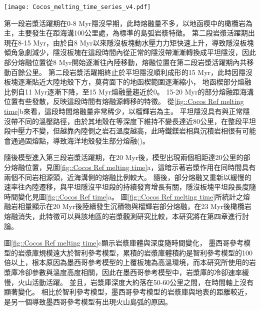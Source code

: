 \begin{figure*}[ht!]
    \centering
    \texttt{[image: Cocos\_melting\_time\_series\_v4.pdf]}
    \caption[墨西哥參考模型岩漿作用隨時間變化]{墨西哥參考模型岩漿作用隨時間變化，灰色底標出平坦隱沒發育後時間段。(a)部分熔融與海溝之距離隨時間變化圖，縱軸中每個點代表每次部分熔融發生位置，顏色為指數上的部分熔融比例。(b)岩石熔融量隨時間變化圖，熔融量單位為每單位海溝產生之立方公里量中每20萬年瞬時量。顏色代表不同岩相。(c)岩漿庫體積與深度隨時間變化圖，岩漿庫單位為每單位海溝之立方公里量。顏色代表該時間中岩漿庫的平均所在深度。}
    \label{fig::Cocos Ref melting time}
\end{figure*}

第一段岩漿活躍期在0-8 Myr隱沒早期，此時熔融量不多，以地函楔中的橄欖岩為主，主要發生在距海溝100公里處，為標準的島弧岩漿特徵。
第二段岩漿活躍期出現在8-15 Myr，由於自8 Myr以來隱沒板塊動水壓力力矩快速上升，導致隱沒板塊傾角急劇減少，隱沒板塊在這段時間內從正常的隱沒帶漸漸轉換成平坦隱沒，因此部分熔融位置從8 Myr開始逐漸往內陸移動，熔融位置在第二段岩漿活躍期內共移動百餘公里。
第二段岩漿活躍期終止於平坦隱沒順利成形的15 Myr，此時因隱沒板塊逐漸貼近大陸地殼下方，莫荷面下的地函楔範圍逐漸縮小，
地函楔部分熔融比例自11 Myr逐漸下降，至15 Myr熔融量趨近於0。
15-20 Myr的部分熔融距海溝位置有些發散，反映這段時間有熔融源轉移的特徵。
從\ref{fig::Cocos Ref melting time}b來看，這段時間熔融量非常稀少，以榴輝岩為主。
平坦隱沒具有與正常隱沒帶不同的溫壓路徑，由於其地殼在等深度下維持不變長達近80公里，在整段平坦段中壓力不變，但越靠內陸側之岩石溫度越高，此時鐵鎂岩相與沉積岩相很有可能會通過固熔點，導致海洋地殼發生部分熔融(\citealp{Gutscher2000Bcan})。

隨後模型進入第三段岩漿活躍期，在20 Myr後，模型出現兩個相距達20公里的部分熔融位置，見圖\ref{fig::Cocos Ref melting time}a，這暗示著岩漿作用在同時間具有兩個不同岩相源頭，近海溝側的熔融比例較大。
隨後，部分熔融又重新以緩慢的速率往內陸遷移，與平坦隱沒平坦段的持續發育增長有關，隱沒板塊平坦段長度隨時間變化見圖\ref{fig::Cocos Ref time}a。
圖\ref{fig::Cocos Ref melting time}所統計之熔融岩相量顯示在20 Myr後陸續發生沉積物與榴輝岩部分熔融，在23 Myr後橄欖岩熔融消失，此特徵可以與該地區的岩漿觀測研究比較，本研究將在第四章進行討論。

圖\ref{fig::Cocos Ref melting time}c顯示岩漿庫體與深度隨時間變化，
墨西哥參考模型的岩漿庫規模遠大於智利參考模型，累積的岩漿庫體積約是智利參考模型的100倍以上，根本原因為墨西哥參考模型的上覆板塊為高溫環境，而本研究所使用的岩漿庫冷卻參數與溫度高度相關，因此在墨西哥參考模型中，岩漿庫的冷卻速率緩慢，火山活動活躍。
並且，岩漿庫深度大約落在50-60公里之間，在時間軸上沒有顯著變化。
相比於智利參考模型，墨西哥參考模型的岩漿庫與地表的距離較近，是另一個導致墨西哥參考模型有出現火山島弧的原因。

